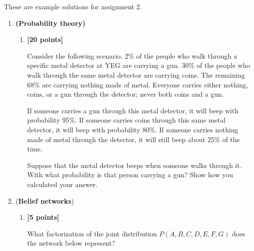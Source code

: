 \documentclass{article}
\newcounter{totalpoints}
\newcommand{\points}[1]{{\addtocounter{totalpoints}{#1}\textbf{[#1 points]}}}
\begin{document}
\pagestyle{myheadings}


These are example solutions for assignment 2.

\begin{enumerate}

\item \textbf{(Probability theory)}

\begin{enumerate}
\item \points{20}

Consider the following scenario.
2\% of the people who walk through a specific metal detector at YEG are carrying a gun.
30\% of the people who walk through the same metal detector are carrying coins.
The remaining 68\% are carrying nothing made of metal.
Everyone carries either nothing, coins, or a gun through the detector; never both coins and a gun.

If someone carries a gun through this metal detector, it will beep with probability 95\%.
If someone carries coins through this same metal detector, it will beep with probability 80\%.
If someone carries nothing made of metal through the detector, it will still beep about 25\% of the time.

Suppose that the metal detector beeps when someone walks through it.  With what probability is that person carrying a gun?  Show how you calculated your answer.

\begin{answer}{1.5in}
\end{answer}

\end{enumerate}

\clearpage
\item (\textbf{Belief networks})

\begin{enumerate}
\item \points{5}
What factorization of the joint distribution $P(A,B,C,D,E,F,G)$ does the network below represent?


\end{enumerate}
\end{enumerate}
\end{document}
